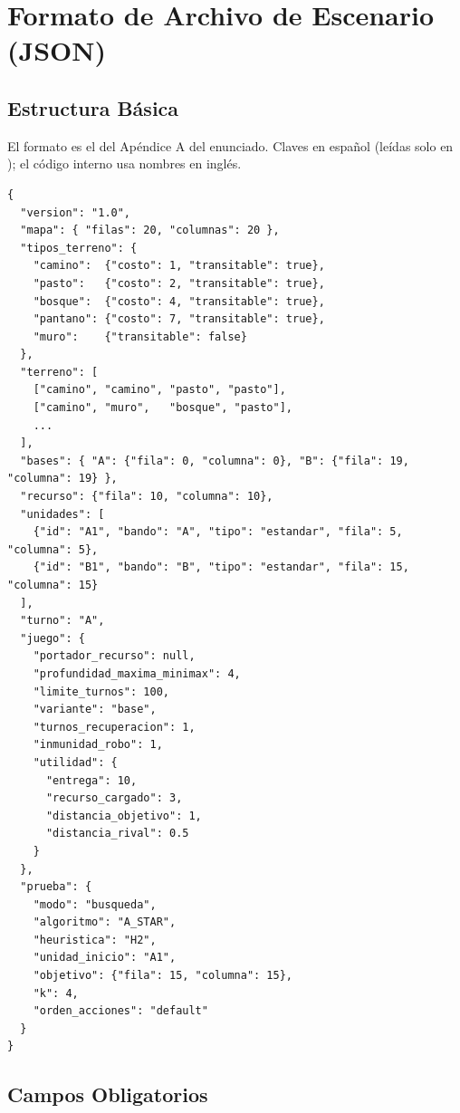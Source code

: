 \chapter{Formato de Archivo de Escenario (JSON)}
\label{man:json}

\section{Estructura Básica}
\label{sec:json-estructura}

El formato es el del Apéndice A del enunciado. Claves en español (leídas solo en );
el código interno usa nombres en inglés.



\begin{verbatim}
{
  "version": "1.0",
  "mapa": { "filas": 20, "columnas": 20 },
  "tipos_terreno": {
    "camino":  {"costo": 1, "transitable": true},
    "pasto":   {"costo": 2, "transitable": true},
    "bosque":  {"costo": 4, "transitable": true},
    "pantano": {"costo": 7, "transitable": true},
    "muro":    {"transitable": false}
  },
  "terreno": [
    ["camino", "camino", "pasto", "pasto"],
    ["camino", "muro",   "bosque", "pasto"],
    ...
  ],
  "bases": { "A": {"fila": 0, "columna": 0}, "B": {"fila": 19, "columna": 19} },
  "recurso": {"fila": 10, "columna": 10},
  "unidades": [
    {"id": "A1", "bando": "A", "tipo": "estandar", "fila": 5, "columna": 5},
    {"id": "B1", "bando": "B", "tipo": "estandar", "fila": 15, "columna": 15}
  ],
  "turno": "A",
  "juego": {
    "portador_recurso": null,
    "profundidad_maxima_minimax": 4,
    "limite_turnos": 100,
    "variante": "base",
    "turnos_recuperacion": 1,
    "inmunidad_robo": 1,
    "utilidad": {
      "entrega": 10,
      "recurso_cargado": 3,
      "distancia_objetivo": 1,
      "distancia_rival": 0.5
    }
  },
  "prueba": {
    "modo": "busqueda",
    "algoritmo": "A_STAR",
    "heuristica": "H2",
    "unidad_inicio": "A1",
    "objetivo": {"fila": 15, "columna": 15},
    "k": 4,
    "orden_acciones": "default"
  }
}
\end{verbatim}

\section{Campos Obligatorios}
\label{sec:campos-obligatorios}

